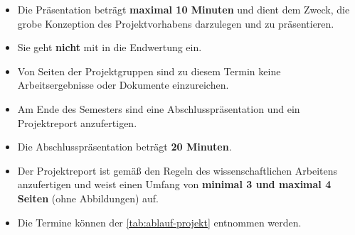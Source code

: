 \begin{frame}
	\begin{itemize}
		\item Die Präsentation beträgt \textbf{maximal 10 Minuten} und dient dem Zweck, die grobe Konzeption des Projektvorhabens darzulegen und zu präsentieren.
		\item Sie geht \textbf{nicht} mit in die Endwertung ein.
		\item Von Seiten der Projektgruppen sind zu diesem Termin keine Arbeitsergebnisse oder Dokumente einzureichen.
	\end{itemize}
	
	\vspace*{3mm}
	\begin{itemize}
		\item Am Ende des Semesters sind eine Abschlusspräsentation und ein Projektreport anzufertigen.
		\item Die Abschlusspräsentation beträgt \textbf{20 Minuten}.
		\item Der Projektreport ist gemäß den Regeln des wissenschaftlichen Arbeitens anzufertigen und weist einen Umfang von \textbf{minimal 3 und maximal 4 Seiten} (ohne Abbildungen) auf.
		\item Die Termine können der \cref{tab:ablauf-projekt} entnommen werden.
	\end{itemize}
\end{frame}


